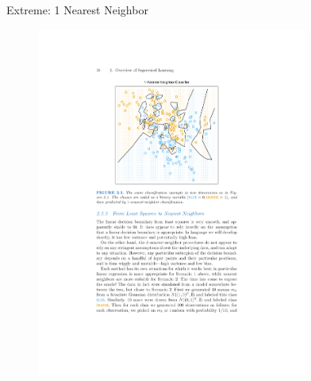 \begin{frame}{Extreme: 1 Nearest Neighbor}
\vspace{-15pt}

\begin{figure}[htbp]
\begin{center}
\includegraphics[width=3.5in]{./resources/classifier1nn.pdf}
\label{class15nn}
\end{center}
\end{figure}
\end{frame}


